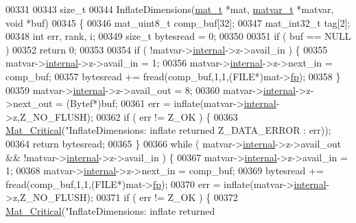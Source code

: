 \begin{DoxyCode}
{{{{{{{{00331 
00343 \textcolor{keywordtype}{size\_t}
00344 InflateDimensions(\hyperlink{struct__mat__t}{mat\_t} *mat, \hyperlink{group___m_a_t_structmatvar__t}{matvar\_t} *matvar, \textcolor{keywordtype}{void} *buf)
00345 \{
00346     mat\_uint8\_t comp\_buf[32];
00347     mat\_int32\_t tag[2];
00348     \textcolor{keywordtype}{int}    err, rank, i;
00349     \textcolor{keywordtype}{size\_t} bytesread = 0;
00350 
00351     \textcolor{keywordflow}{if} ( buf == NULL )
00352         \textcolor{keywordflow}{return} 0;
00353 
00354     \textcolor{keywordflow}{if} ( !matvar->\hyperlink{group___m_a_t_a6e97e3ed9f40c49322c18561c2a94e92}{internal}->z->avail\_in ) \{
00355         matvar->\hyperlink{group___m_a_t_a6e97e3ed9f40c49322c18561c2a94e92}{internal}->z->avail\_in = 1;
00356         matvar->\hyperlink{group___m_a_t_a6e97e3ed9f40c49322c18561c2a94e92}{internal}->z->next\_in = comp\_buf;
00357         bytesread += fread(comp\_buf,1,1,(FILE*)mat->\hyperlink{struct__mat__t_a85f562e407ca9ad4d2a6e14f839432b7}{fp});
00358     \}
00359     matvar->\hyperlink{group___m_a_t_a6e97e3ed9f40c49322c18561c2a94e92}{internal}->z->avail\_out = 8;
00360     matvar->\hyperlink{group___m_a_t_a6e97e3ed9f40c49322c18561c2a94e92}{internal}->z->next\_out = (Bytef*)buf;
00361     err = inflate(matvar->\hyperlink{group___m_a_t_a6e97e3ed9f40c49322c18561c2a94e92}{internal}->z,Z\_NO\_FLUSH);
00362     \textcolor{keywordflow}{if} ( err != Z\_OK ) \{
00363         \hyperlink{group__mat__util_gaf51f2bfbb5580f575e4dd79757e2b80c}{Mat\_Critical}(\textcolor{stringliteral}{"InflateDimensions: inflate returned %
      Z\_DATA\_ERROR : err));
00364         \textcolor{keywordflow}{return} bytesread;
00365     \}
00366     \textcolor{keywordflow}{while} ( matvar->\hyperlink{group___m_a_t_a6e97e3ed9f40c49322c18561c2a94e92}{internal}->z->avail\_out && !matvar->\hyperlink{group___m_a_t_a6e97e3ed9f40c49322c18561c2a94e92}{internal}->z->avail\_in ) \{
00367         matvar->\hyperlink{group___m_a_t_a6e97e3ed9f40c49322c18561c2a94e92}{internal}->z->avail\_in = 1;
00368         matvar->\hyperlink{group___m_a_t_a6e97e3ed9f40c49322c18561c2a94e92}{internal}->z->next\_in = comp\_buf;
00369         bytesread += fread(comp\_buf,1,1,(FILE*)mat->\hyperlink{struct__mat__t_a85f562e407ca9ad4d2a6e14f839432b7}{fp});
00370         err = inflate(matvar->\hyperlink{group___m_a_t_a6e97e3ed9f40c49322c18561c2a94e92}{internal}->z,Z\_NO\_FLUSH);
00371         \textcolor{keywordflow}{if} ( err != Z\_OK ) \{
00372             \hyperlink{group__mat__util_gaf51f2bfbb5580f575e4dd79757e2b80c}{Mat\_Critical}(\textcolor{stringliteral}{"InflateDimensions: inflate returned %
}}}}}}}}}}
\end{DoxyCode}
